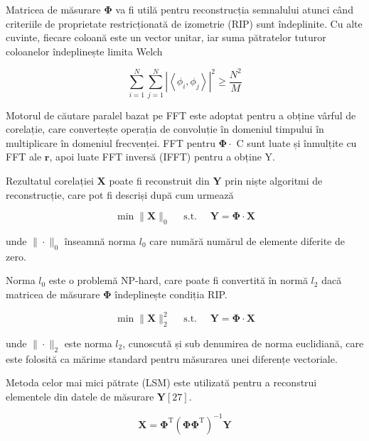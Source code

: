 \documentclass[10pt]{report}
\begin{document}
Matricea de măsurare \(\boldsymbol{\Phi}\) va fi utilă pentru reconstrucția semnalului  atunci când criteriile de proprietate restricționată de izometrie (RIP) sunt îndeplinite. Cu alte cuvinte, fiecare coloană este un vector unitar, iar suma pătratelor tuturor coloanelor îndeplinește limita Welch


\begin{equation}
    \sum_{i=1}^{N} \sum_{j=1}^{N}\left|\left\langle\phi_{i}, \phi_{j}\right\rangle\right|^{2 } \geq \frac{N^{2}}{M}
\end{equation}

Motorul de căutare paralel bazat pe FFT este adoptat pentru a obține vârful de corelație, care convertește operația de convoluție în domeniul timpului în multiplicare în domeniul frecvenței. FFT pentru \(\boldsymbol{\Phi} \cdot\) C sunt luate și înmulțite cu FFT ale \(\mathbf{r}\), apoi luate FFT inversă (IFFT) pentru a obține Y.

Rezultatul corelației \(\mathbf{X}\) poate fi reconstruit din \(\mathbf{Y}\) prin niște algoritmi de reconstrucție, care pot fi descriși după cum urmează


\begin{equation}
    \min \|\mathbf{X}\|_{0} \quad \text { s.t. } \quad \mathbf{Y}=\mathbf{\Phi} \cdot \mathbf{X}
\end{equation}


unde \(\|\cdot\|_{0}\) înseamnă norma \(l_{0}\) care numără numărul de elemente diferite de zero.

Norma \(l_{0}\) este o problemă NP-hard, care poate fi convertită în normă \(l_{2}\) dacă matricea de măsurare \(\boldsymbol{\Phi}\) îndeplinește condiția RIP.


\begin{equation}
    \min \|\mathbf{X}\|_{2}^{2} \quad \text { s.t. } \quad \mathbf{Y}=\boldsymbol{\Phi} \cdot \mathbf{X}
\end{equation}


unde \(\|\cdot\|_{2}\) este norma \(l_{2}\), cunoscută și sub denumirea de norma euclidiană, care este folosită ca mărime standard pentru măsurarea unei diferențe vectoriale.

Metoda celor mai mici pătrate (LSM) este utilizată pentru a reconstrui elementele din datele de măsurare \(\mathbf{Y}[27]\).


\begin{equation}
    \mathbf{X}=\boldsymbol{\Phi}^{\mathrm{T}}\left(\boldsymbol{\Phi} \boldsymbol{\Phi}^{\mathrm{T}}\right)^{-1 } \mathbf{Y}
\end{equation}
\end{document}
